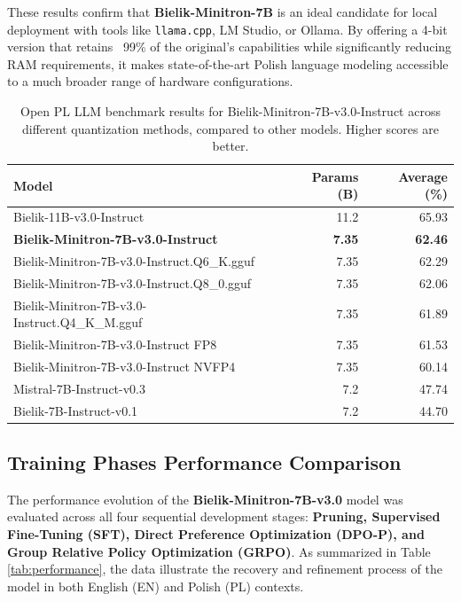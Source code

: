\documentclass{article}
\begin{document}
These results confirm that \textbf{Bielik-Minitron-7B} is an ideal candidate for local deployment with tools like \texttt{llama.cpp}, LM Studio, or Ollama. By offering a 4-bit version that retains ~99\% of the original's capabilities while significantly reducing RAM requirements, it makes state-of-the-art Polish language modeling accessible to a much broader range of hardware configurations.

\begin{table}[t]
    \centering
    \small
    \begin{tabular}{lrr}
    \toprule
    \textbf{Model} & \textbf{Params (B)} & \textbf{Average (\%)} \\
    \midrule
    Bielik-11B-v3.0-Instruct & 11.2 & 65.93 \\
    \textbf{Bielik-Minitron-7B-v3.0-Instruct} & \textbf{7.35} & \textbf{62.46} \\
    Bielik-Minitron-7B-v3.0-Instruct.Q6\_K.gguf & 7.35 & 62.29 \\
    Bielik-Minitron-7B-v3.0-Instruct.Q8\_0.gguf & 7.35 & 62.06 \\
    Bielik-Minitron-7B-v3.0-Instruct.Q4\_K\_M.gguf & 7.35 & 61.89 \\
    Bielik-Minitron-7B-v3.0-Instruct FP8 & 7.35 & 61.53 \\
    Bielik-Minitron-7B-v3.0-Instruct NVFP4 & 7.35 & 60.14 \\
    Mistral-7B-Instruct-v0.3 & 7.2 & 47.74 \\
    Bielik-7B-Instruct-v0.1 & 7.2 & 44.70 \\
    \bottomrule
    \end{tabular}
    \caption{Open PL LLM benchmark results for Bielik-Minitron-7B-v3.0-Instruct across different quantization methods, compared to other models. Higher scores are better.}
    \label{tab:quantization-results}
\end{table}



\subsection{Training Phases Performance Comparison}
The performance evolution of the \textbf{Bielik-Minitron-7B-v3.0} model was evaluated across all four sequential development stages: \textbf{Pruning, Supervised Fine-Tuning (SFT), Direct Preference Optimization (DPO-P), and Group Relative Policy Optimization (GRPO)}. As summarized in Table \ref{tab:performance}, the data illustrate the recovery and refinement process of the model in both English (EN) and Polish (PL) contexts.
\end{document}
